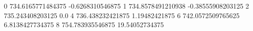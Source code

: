 0 734.6165771484375 -0.6268310546875
1 734.8578491210938 -0.38555908203125
2 735.243408203125 0.0
4 736.438232421875 1.19482421875
6 742.0572509765625 6.8138427734375
8 754.783935546875 19.54052734375

